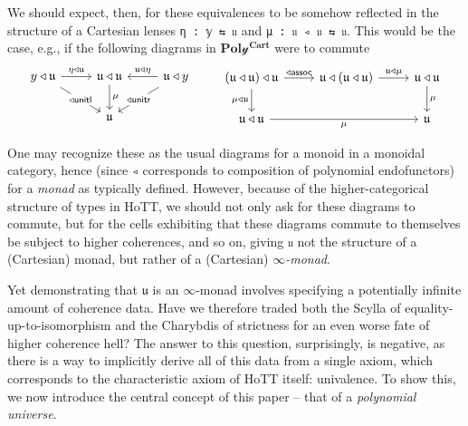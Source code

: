\documentclass[
  11pt,
  oneside,
  article]{memoir}
\theoremstyle{definition}
\theoremstyle{plain}
\newcommand{\yon}{\mathcal{y}}
\newcommand{\0}{\textsf{0}}
\newcommand{\1}{\tn{\textsf{1}}}
\begin{document}
We should expect, then, for these equivalences to be somehow reflected
in the structure of a Cartesian lenses \texttt{η\ :\ 𝕪\ ⇆\ 𝔲} and
\texttt{μ\ :\ 𝔲\ ◃\ 𝔲\ ⇆\ 𝔲}. This would be the case, e.g., if the
following diagrams in \(\mathbf{Pol\yon^{Cart}}\) were to commute \[
\begin{tikzcd}
    {y \triangleleft \mathfrak{u}} & {\mathfrak{u} \triangleleft \mathfrak{u} } & {\mathfrak{u} \triangleleft y} \\
    & {\mathfrak{u}}
    \arrow["{\eta \triangleleft \mathfrak{u}}", from=1-1, to=1-2]
    \arrow["{\mathsf{\triangleleft unitl}}"{description}, from=1-1, to=2-2]
    \arrow["\mu", from=1-2, to=2-2]
    \arrow["{\mathfrak{u} \triangleleft \eta}"', from=1-3, to=1-2]
    \arrow["{\mathsf{\triangleleft unitr}}"{description}, from=1-3, to=2-2]
\end{tikzcd} \qquad \begin{tikzcd}
    {(\mathfrak{u} \triangleleft \mathfrak{u}) \triangleleft \mathfrak{u}} & {\mathfrak{u} \triangleleft (\mathfrak{u} \triangleleft \mathfrak{u})} & {\mathfrak{u} \triangleleft \mathfrak{u}} \\
    {\mathfrak{u} \triangleleft \mathfrak{u}} && {\mathfrak{u}}
    \arrow["{\mathsf{\triangleleft assoc}}", from=1-1, to=1-2]
    \arrow["{\mu \triangleleft \mathfrak{u}}"', from=1-1, to=2-1]
    \arrow["{\mathfrak{u} \triangleleft \mu}", from=1-2, to=1-3]
    \arrow["\mu", from=1-3, to=2-3]
    \arrow["\mu"', from=2-1, to=2-3]
\end{tikzcd}
\]

One may recognize these as the usual diagrams for a monoid in a monoidal
category, hence (since \texttt{◃} corresponds to composition of
polynomial endofunctors) for a \emph{monad} as typically defined.
However, because of the higher-categorical structure of types in HoTT,
we should not only ask for these diagrams to commute, but for the cells
exhibiting that these diagrams commute to themselves be subject to
higher coherences, and so on, giving \texttt{𝔲} not the structure of a
(Cartesian) monad, but rather of a (Cartesian) \emph{\(\infty\)-monad}.

Yet demonstrating that \(𝔲\) is an \(\infty\)-monad involves specifying
a potentially infinite amount of coherence data. Have we therefore
traded both the Scylla of equality-up-to-isomorphism and the Charybdis
of strictness for an even worse fate of higher coherence hell? The
answer to this question, surprisingly, is negative, as there is a way to
implicitly derive all of this data from a single axiom, which
corresponds to the characteristic axiom of HoTT itself: univalence. To
show this, we now introduce the central concept of this paper -- that of
a \emph{polynomial universe}.
\end{document}
